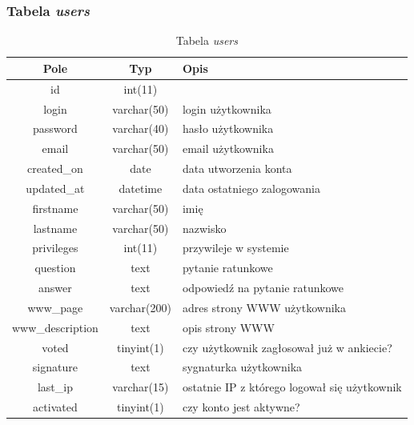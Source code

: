 \documentclass[a4paper,12pt,oneside]{report}
\begin{document}
\subsubsection{Tabela \emph{users}}
\label{subsub:users}

\begin{table}[h]
  \centering
  \begin{tabular}{|c|c|l|}\hline
  Pole & Typ & Opis \\\hline
  id              & int(11)      & \\
  login           & varchar(50)  & login użytkownika \\
  password        & varchar(40)  & hasło użytkownika \\
  email           & varchar(50)  & email użytkownika \\
  created\_on      & date         & data utworzenia konta \\
  updated\_at      & datetime     & data ostatniego zalogowania\\
  firstname       & varchar(50)  & imię \\
  lastname        & varchar(50)  & nazwisko \\
  privileges      & int(11)      & przywileje w systemie \\
  question        & text         & pytanie ratunkowe \\
  answer          & text         & odpowiedź na pytanie ratunkowe \\
  www\_page        & varchar(200) & adres strony WWW użytkownika\\
  www\_description & text         & opis strony WWW \\
  voted           & tinyint(1)   & czy użytkownik zagłosował już w ankiecie? \\
  signature       & text         & sygnaturka użytkownika \\
  last\_ip         & varchar(15)  & ostatnie IP z którego logował się użytkownik \\
  activated       & tinyint(1)   & czy konto jest aktywne? \\\hline
  \end{tabular}
  \caption{Tabela \emph{users}\label{tab:users}}
\end{table}
\end{document}

